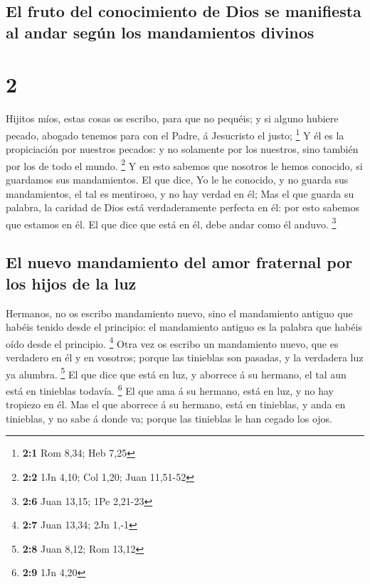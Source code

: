 \hypertarget{el-fruto-del-conocimiento-de-dios-se-manifiesta-al-andar-seguxfan-los-mandamientos-divinos}{%
\subsection{El fruto del conocimiento de Dios se manifiesta al andar
según los mandamientos
divinos}\label{el-fruto-del-conocimiento-de-dios-se-manifiesta-al-andar-seguxfan-los-mandamientos-divinos}}

\hypertarget{section-1}{%
\section{2}\label{section-1}}

 Hijitos míos, estas cosas os escribo, para que no pequéis;
y si alguno hubiere pecado, abogado tenemos para con el Padre, á
Jesucristo el justo; \footnote{\textbf{2:1} Rom 8,34; Heb 7,25}
 Y él es la propiciación por nuestros pecados: y no
solamente por los nuestros, sino también por los de todo el mundo.
\footnote{\textbf{2:2} 1Jn 4,10; Col 1,20; Juan 11,51-52}  Y
en esto sabemos que nosotros le hemos conocido, si guardamos sus
mandamientos.  El que dice, Yo le he conocido, y no guarda
sus mandamientos, el tal es mentiroso, y no hay verdad en él;
 Mas el que guarda su palabra, la caridad de Dios está
verdaderamente perfecta en él: por esto sabemos que estamos en él.
 El que dice que está en él, debe andar como él anduvo.
\footnote{\textbf{2:6} Juan 13,15; 1Pe 2,21-23}

\hypertarget{el-nuevo-mandamiento-del-amor-fraternal-por-los-hijos-de-la-luz}{%
\subsection{El nuevo mandamiento del amor fraternal por los hijos de la
luz}\label{el-nuevo-mandamiento-del-amor-fraternal-por-los-hijos-de-la-luz}}

 Hermanos, no os escribo mandamiento nuevo, sino el
mandamiento antiguo que habéis tenido desde el principio: el mandamiento
antiguo es la palabra que habéis oído desde el principio. \footnote{\textbf{2:7}
  Juan 13,34; 2Jn 1,-1}  Otra vez os escribo un mandamiento
nuevo, que es verdadero en él y en vosotros; porque las tinieblas son
pasadas, y la verdadera luz ya alumbra. \footnote{\textbf{2:8} Juan
  8,12; Rom 13,12}  El que dice que está en luz, y aborrece
á su hermano, el tal aun está en tinieblas todavía. \footnote{\textbf{2:9}
  1Jn 4,20}  El que ama á su hermano, está en luz, y no hay
tropiezo en él.  Mas el que aborrece á su hermano, está en
tinieblas, y anda en tinieblas, y no sabe á donde va; porque las
tinieblas le han cegado los ojos.

